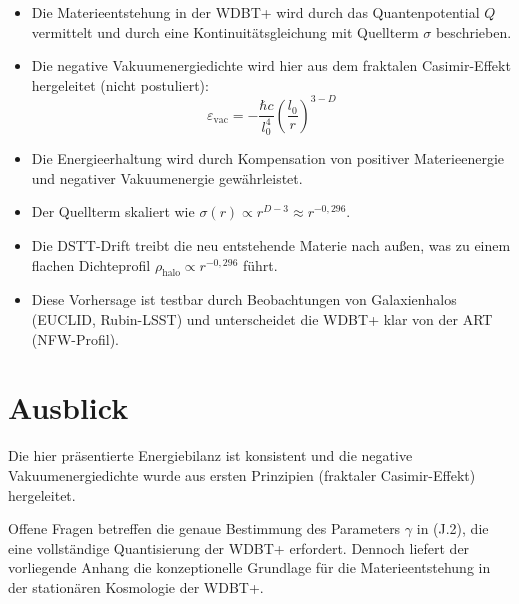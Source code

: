 \begin{itemize}
    \item Die Materieentstehung in der WDBT+ wird durch das Quantenpotential \( Q \) 
          vermittelt und durch eine Kontinuitätsgleichung mit Quellterm \( \sigma \) 
          beschrieben.
    \item Die negative Vakuumenergiedichte wird hier aus dem fraktalen Casimir-Effekt 
          hergeleitet (nicht postuliert):
          \[
          \varepsilon_{\text{vac}} = -\frac{\hbar c}{l_0^4} \left( \frac{l_0}{r} \right)^{3-D}
          \]
    \item Die Energieerhaltung wird durch Kompensation von positiver Materieenergie und 
          negativer Vakuumenergie gewährleistet.
    \item Der Quellterm skaliert wie \( \sigma(r) \propto r^{D-3} \approx r^{-0,296} \).
    \item Die DSTT-Drift treibt die neu entstehende Materie nach außen, was zu einem 
          flachen Dichteprofil \( \rho_{\text{halo}} \propto r^{-0,296} \) führt.
    \item Diese Vorhersage ist testbar durch Beobachtungen von Galaxienhalos 
          (EUCLID, Rubin-LSST) und unterscheidet die WDBT+ klar von der ART (NFW-Profil).
\end{itemize}

\section{Ausblick}

Die hier präsentierte Energiebilanz ist konsistent und die negative Vakuumenergiedichte 
wurde aus ersten Prinzipien (fraktaler Casimir-Effekt) hergeleitet. 

Offene Fragen betreffen die genaue Bestimmung des Parameters \( \gamma \) in (J.2), 
die eine vollständige Quantisierung der WDBT+ erfordert. Dennoch liefert der 
vorliegende Anhang die konzeptionelle Grundlage für die Materieentstehung in der 
stationären Kosmologie der WDBT+.
